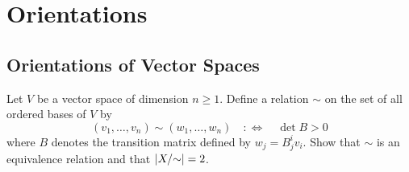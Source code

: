 \chapter{Orientations}
\section{Orientations of Vector Spaces}
\begin{exercise}
	Let $V$ be a vector space of dimension $n \geq 1$. Define a relation $\sim$ on the set of all ordered bases of $V$ by 
	\begin{equation}
		(v_1,\dots,v_n) \sim (w_1,\dots,w_n) \quad :\Leftrightarrow \quad \det B > 0
	\end{equation}
	\noindent where $B$ denotes the transition matrix defined by $w_j = B^i_j v_i$. Show that $\sim$ is an equivalence relation and that $\abs[0]{X/{\sim}} = 2$.
\end{exercise}

